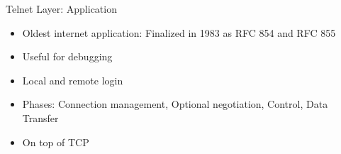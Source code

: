 \documentclass[main.tex]{subfiles}
\begin{document}
\begin{flashcard}{Telnet}
    Layer: Application
    \begin{itemize}
        \item Oldest internet application: Finalized in 1983 as RFC 854 and RFC 855
        \item Useful for debugging
        \item Local and remote login
        \item Phases: Connection management, Optional negotiation, Control, Data Transfer
        \item On top of TCP
    \end{itemize}
\end{flashcard}
\end{document}
